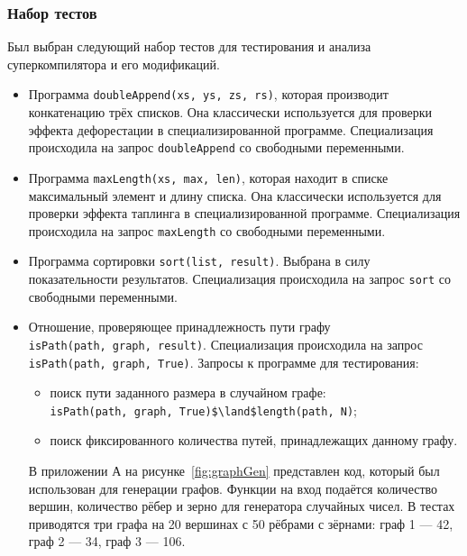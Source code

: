 \subsubsection{Набор тестов}

Был выбран следующий набор тестов для тестирования и анализа суперкомпилятора и его модификаций.
\begin{itemize}
 \item Программа \lstinline{doubleAppend(xs, ys, zs, rs)}, которая
       производит конкатенацию трёх списков. Она классически используется
       для проверки эффекта дефорестации в специализированной программе.
       Специализация происходила на запрос \lstinline{doubleAppend} со свободными переменными.
 \item Программа \lstinline{maxLength(xs, max, len)}, которая находит в списке
       максимальный элемент и длину списка. Она классически используется
       для проверки эффекта таплинга в специализированной программе.
       Специализация происходила на запрос \lstinline{maxLength} со свободными переменными.
 \item Программа сортировки \lstinline{sort(list, result)}. Выбрана в силу показательности
       результатов.
       Специализация происходила на запрос \lstinline{sort} со свободными переменными.
 \item Отношение, проверяющее принадлежность пути графу \\
       \lstinline{isPath(path, graph, result)}.
       Специализация происходила на запрос \lstinline{isPath(path, graph, True)}.
       Запросы к программе для тестирования:
       \begin{itemize}
       \item поиск пути заданного размера в случайном графе: \\
       \lstinline{isPath(path, graph, True)$\land$length(path, N)};
       \item поиск фиксированного количества путей, принадлежащих данному графу.
       \end{itemize}

	   В приложении А на рисунке~\ref{fig:graphGen} представлен код, который
	   был использован для генерации графов. Функции на вход
	   подаётся количество вершин, количество рёбер и зерно для генератора случайных чисел.
	   В тестах приводятся три графа на 20 вершинах с 50 рёбрами
	   с зёрнами: граф 1 --- 42, граф 2 --- 34, граф 3 --- 106.


\end{itemize}
